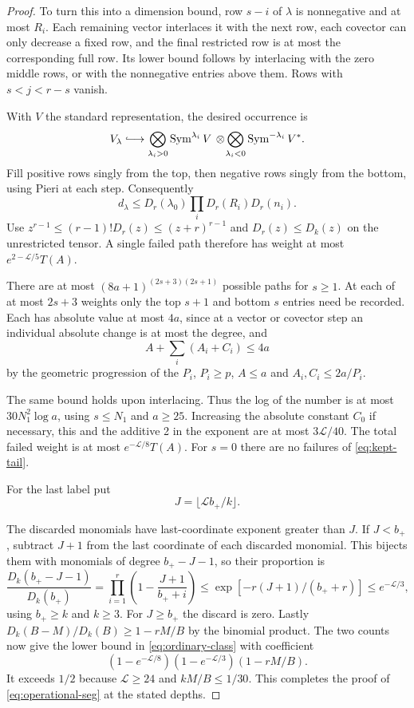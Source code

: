 \begin{proof}
To turn this into a dimension bound, row \(s-i\) of
\(\lambda\) is nonnegative and at most \(R_i\).
Each remaining vector interlaces it with the next row,
each covector can only decrease a fixed row, and the
final restricted row is at most the corresponding full
row. Its lower bound follows by interlacing with the zero
middle rows, or with the nonnegative entries above them.
Rows with \(s<j<r-s\) vanish.

With \(V\) the standard representation, the desired occurrence is
\[
 V_\lambda\lhook\joinrel\longrightarrow \bigotimes_{\lambda_i>0}\operatorname{Sym}^{\lambda_i} V\,\otimes\!\bigotimes_{\lambda_i<0}\operatorname{Sym}^{-\lambda_i} V^*.
\]
Fill positive rows singly from the top, then negative
rows singly from the bottom, using Pieri at each step.
Consequently
\[
 d_\lambda\le D_r(\lambda_0)\prod_iD_r(R_i)D_r(n_i).
\]
Use \(z^{r-1}\le(r-1)!D_r(z)\le(z+r)^{r-1}\) and
\(D_r(z)\le D_k(z)\) on the unrestricted tensor. A single
failed path therefore has weight at most
\(e^{2-\mathcal L/5}T(A)\).

There are at most \((8a+1)^{(2s+3)(2s+1)}\) possible paths
for \(s\ge1\). At each of at most \(2s+3\) weights only the
top \(s+1\) and bottom \(s\) entries need be recorded.
Each has absolute value at most \(4a\), since at a vector or
covector step an individual absolute change is at most
the degree, and
\[
 A+\sum_i(A_i+C_i)\le4a
\]
by the
geometric progression of the \(P_i\), \(P_i\ge p\),
\(A\le a\) and \(A_i,C_i\le 2a/P_i\).

The same bound holds upon interlacing. Thus the log of the
number is at most \(30N_1^2\log a\), using \(s\le N_1\)
and \(a\ge25\). Increasing the absolute constant \(C_0\)
if necessary, this and the additive 2 in the exponent
are at most \(3\mathcal L/40\). The total failed weight
is at most \(e^{-\mathcal L/8}T(A)\). For \(s=0\)
there are no failures of \eqref{eq:kept-tail}.

For the last label put
\[
 J=\lfloor\mathcal L b_+/k\rfloor.
\]

The discarded monomials have last-coordinate exponent
greater than \(J\). If \(J<b_+\), subtract \(J+1\) from the last coordinate
of each discarded monomial. This bijects them with monomials
of degree \(b_+-J-1\), so their proportion is
\[
 \frac{D_k(b_+-J-1)}{D_k(b_+)}
 =\prod_{i=1}^r\left(1-\frac{J+1}{b_++i}\right)
 \le \exp[-r(J+1)/(b_++r)]\le e^{-\mathcal L/3},
\]
using \(b_+\ge k\) and \(k\ge 3\). For \(J\ge b_+\)
the discard is zero. Lastly
\(D_k(B-M)/D_k(B)\ge1-rM/B\) by the binomial product.
The two counts now give the lower bound in
\eqref{eq:ordinary-class} with coefficient
\begin{equation}\label{eq:rank-fraction}
 (1-e^{-\mathcal L/8})(1-e^{-\mathcal L/3})(1-rM/B).
\end{equation}
It exceeds \(1/2\) because \(\mathcal L\ge24\) and
\(kM/B\le1/30\). This completes the proof of
\eqref{eq:operational-seg} at the stated depths.

\end{proof}

